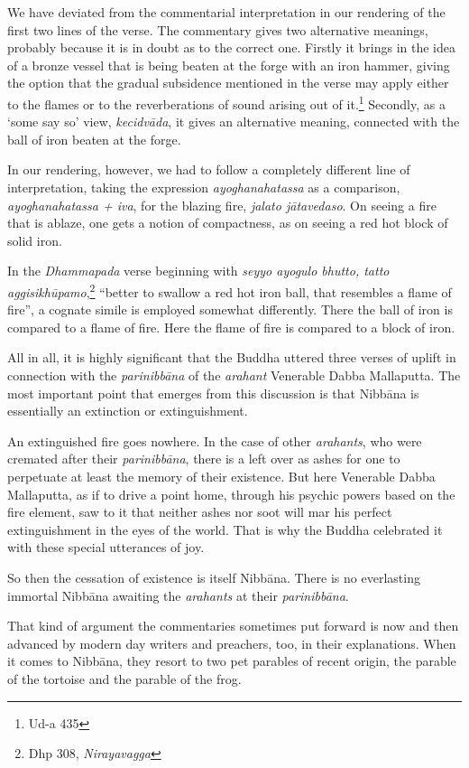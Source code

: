 We have deviated from the commentarial interpretation in our rendering of the first two lines of the verse. The commentary gives two alternative meanings, probably because it is in doubt as to the correct one. Firstly it brings in the idea of a bronze vessel that is being beaten at the forge with an iron hammer, giving the option that the gradual subsidence mentioned in the verse may apply either to the flames or to the reverberations of sound arising out of it.\footnote{Ud-a 435} Secondly, as a `some say so' view, \emph{kecidvāda}, it gives an alternative meaning, connected with the ball of iron beaten at the forge.

In our rendering, however, we had to follow a completely different line of interpretation, taking the expression \emph{ayoghanahatassa} as a comparison, \emph{ayoghanahatassa + iva}, for the blazing fire, \emph{jalato jātavedaso}. On seeing a fire that is ablaze, one gets a notion of compactness, as on seeing a red hot block of solid iron.

In the \emph{Dhammapada} verse beginning with \emph{seyyo ayogulo bhutto, tatto aggisikhūpamo},\footnote{Dhp 308, \emph{Nirayavagga}} ``better to swallow a red hot iron ball, that resembles a flame of fire'', a cognate simile is employed somewhat differently. There the ball of iron is compared to a flame of fire. Here the flame of fire is compared to a block of iron.

All in all, it is highly significant that the Buddha uttered three verses of uplift in connection with the \emph{parinibbāna} of the \emph{arahant} Venerable Dabba Mallaputta. The most important point that emerges from this discussion is that Nibbāna is essentially an extinction or extinguishment.

An extinguished fire goes nowhere. In the case of other \emph{arahants}, who were cremated after their \emph{parinibbāna}, there is a left over as ashes for one to perpetuate at least the memory of their existence. But here Venerable Dabba Mallaputta, as if to drive a point home, through his psychic powers based on the fire element, saw to it that neither ashes nor soot will mar his perfect extinguishment in the eyes of the world. That is why the Buddha celebrated it with these special utterances of joy.

So then the cessation of existence is itself Nibbāna. There is no everlasting immortal Nibbāna awaiting the \emph{arahants} at their \emph{parinibbāna}.

That kind of argument the commentaries sometimes put forward is now and then advanced by modern day writers and preachers, too, in their explanations. When it comes to Nibbāna, they resort to two pet parables of recent origin, the parable of the tortoise and the parable of the frog.


